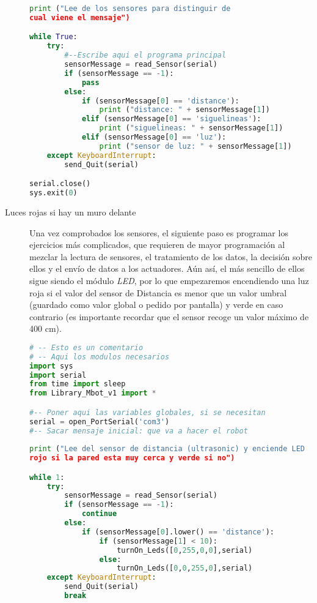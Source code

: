 \begin{description}
\begin{lstlisting}[language=python,caption={Solución para distinguir los sensores en Python}]
print ("Lee de los sensores para distinguir de 
cual viene el mensaje")

while True:
	try:
		#--Escribe aqui el programa principal
		sensorMessage = read_Sensor(serial)
		if (sensorMessage == -1):
			pass
		else:
			if (sensorMessage[0] == 'distance'):
				print ("distance: " + sensorMessage[1])
			elif (sensorMessage[0] == 'siguelineas'):
				print ("siguelineas: " + sensorMessage[1])
			elif (sensorMessage[0] == 'luz'):
				print ("sensor de luz: " + sensorMessage[1])
	except KeyboardInterrupt:
		send_Quit(serial)

serial.close()
sys.exit(0)
\end{lstlisting}

	\item [Luces rojas si hay un muro delante] Una vez comprobados los sensores, el siguiente paso es programar los ejercicios más complicados, que requieren de mayor programación al mezclar la lectura de sensores, el tratamiento de los datos, la decisión sobre ellos y el envío de datos a los actuadores. Aún así, el más sencillo de ellos sigue siendo el módulo \textit{LED}, por lo que empezaremos encendiendo una luz roja si el valor del sensor de Distancia es menor que un valor umbral (guardado como valor global o pedido por pantalla) y verde en caso contrario (es importante recordar que el sensor recoge un valor máximo de 400 cm).
\begin{lstlisting}[language=python,caption={Solución del ejercicio de LEDs y sensor de Distancia en Python}]
# -- Esto es un comentario		
# -- Aqui los modulos necesarios
import sys
import serial
from time import sleep
from Library_Mbot_v1 import *

#-- Poner aqui las variables globales, si se necesitan
serial = open_PortSerial('com3')
#-- Sacar mensaje inicial: que va a hacer el robot
	
print ("Lee del sensor de distancia (ultrasonic) y enciende LED 
rojo si la pared esta muy cerca y verde si no")

while 1:
	try:
		sensorMessage = read_Sensor(serial)    
		if (sensorMessage == -1):
			continue
		else:
			if (sensorMessage[0].lower() == 'distance'):
				if (sensorMessage[1] < 10):
					turnOn_Leds([0,255,0,0],serial)
				else:
					turnOn_Leds([0,0,255,0],serial)
	except KeyboardInterrupt:
		send_Quit(serial)
		break
	

\end{lstlisting}
\end{description}
